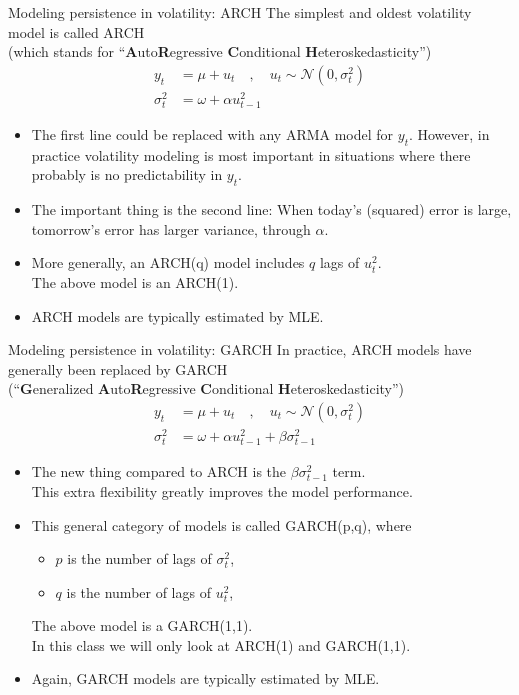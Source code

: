 \documentclass[t,12pt]{beamer}
\begin{document}
\begin{frame}[c]{Modeling persistence in volatility: ARCH}
The simplest and oldest volatility model is called ARCH
\\ (which stands for ``\textbf{A}uto\textbf{R}egressive \textbf{C}onditional \textbf{H}eteroskedasticity'')
\vspace{-0.1in}
\begin{align*}
y_t &= \mu + u_t \quad , \quad u_t \sim \mathscr{N}(0,\sigma_t^2)
\\
\sigma_t^2 &= \omega + \alpha u_{t-1}^2
\end{align*}
\begin{itemize}
\vspace{-0.3in}
\item The first line could be replaced with any ARMA model for $y_t$.
However, in practice volatility modeling is most important in situations where there probably is no predictability in $y_t$. %
\item The important thing is the second line:
When today's (squared) error is large, tomorrow's error has larger variance, through $\alpha$.
\item More generally, an ARCH(q) model includes $q$ lags of $u_t^2$.
\\ The above model is an ARCH(1).
\item ARCH models are typically estimated by MLE.
\end{itemize}
\end{frame}

\begin{frame}[c]{Modeling persistence in volatility: GARCH}
In practice, ARCH models have generally been replaced by GARCH
\\ (``\textbf{G}eneralized \textbf{A}uto\textbf{R}egressive \textbf{C}onditional \textbf{H}eteroskedasticity'')
\vspace{-0.1in}
\begin{align*}
y_t &= \mu + u_t \quad , \quad u_t \sim \mathscr{N}(0,\sigma_t^2)
\\
\sigma_t^2 &= \omega + \alpha u_{t-1}^2 + \beta \sigma_{t-1}^2
\end{align*}
\begin{itemize}
\vspace{-0.3in}
\item The new thing compared to ARCH is the $\beta \sigma_{t-1}^2$ term.
\\ This extra flexibility greatly improves the model performance.
\item This general category of models is called GARCH(p,q), where
\begin{itemize}
\item $p$ is the number of lags of $\sigma_t^2$,
\item $q$ is the number of lags of $u_t^2$,
\end{itemize}
The above model is a GARCH(1,1). 
\\ In this class we will only look at ARCH(1) and GARCH(1,1).
\item Again, GARCH models are typically estimated by MLE.
\end{itemize}
\end{frame}
\end{document}
